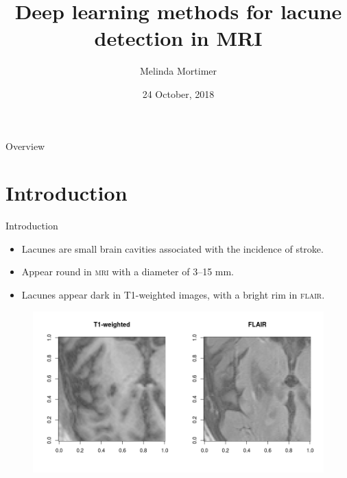 \documentclass{beamer}
\title{Deep learning methods for lacune detection in MRI}
\author{Melinda Mortimer}
\institute[UNSW] %
{
  Supervisors: Dr Pierre Lafaye de Micheaux and A/Prof. Wei Wen
}
\date{24 October, 2018}
\begin{document}
\begin{frame}
	\titlepage
\end{frame}


\begin{frame}{Overview}
	\tableofcontents
\end{frame}

\section{Introduction}
\begin{frame}{Introduction}
    \begin{itemize}
    \item Lacunes are small brain cavities associated with the incidence of stroke.
    \item Appear round in \textsc{mri} with a diameter of 3--15 mm.
	\item Lacunes appear dark in T1-weighted images, with a bright rim in \textsc{flair}.
    \end{itemize}
    	\begin{figure}
	\centering
	\includegraphics[width=0.8\linewidth]{../Thesis_Docs/Images/2_lacune_t1_flair.png}
	\end{figure}
\end{frame}
\end{document}
